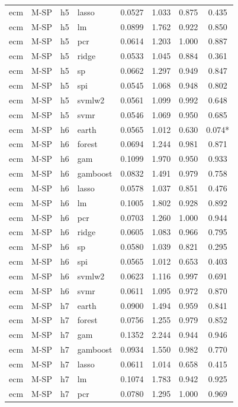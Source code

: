 \begin{ThreePartTable}
\begin{longtable}[t]{llclcccc}
ecm & M-SP & h5 & lasso & 0.0527 & 1.033 & 0.875 & 0.435\\
ecm & M-SP & h5 & lm & 0.0899 & 1.762 & 0.922 & 0.850\\
ecm & M-SP & h5 & pcr & 0.0614 & 1.203 & 1.000 & 0.887\\
ecm & M-SP & h5 & ridge & 0.0533 & 1.045 & 0.884 & 0.361\\
ecm & M-SP & h5 & sp & 0.0662 & 1.297 & 0.949 & 0.847\\
ecm & M-SP & h5 & spi & 0.0545 & 1.068 & 0.948 & 0.802\\
ecm & M-SP & h5 & svmlw2 & 0.0561 & 1.099 & 0.992 & 0.648\\
ecm & M-SP & h5 & svmr & 0.0546 & 1.069 & 0.950 & 0.685\\
\addlinespace
ecm & M-SP & h6 & earth & 0.0565 & 1.012 & 0.630 & 0.074*\\
ecm & M-SP & h6 & forest & 0.0694 & 1.244 & 0.981 & 0.871\\
ecm & M-SP & h6 & gam & 0.1099 & 1.970 & 0.950 & 0.933\\
ecm & M-SP & h6 & gamboost & 0.0832 & 1.491 & 0.979 & 0.758\\
ecm & M-SP & h6 & lasso & 0.0578 & 1.037 & 0.851 & 0.476\\
ecm & M-SP & h6 & lm & 0.1005 & 1.802 & 0.928 & 0.892\\
ecm & M-SP & h6 & pcr & 0.0703 & 1.260 & 1.000 & 0.944\\
ecm & M-SP & h6 & ridge & 0.0605 & 1.083 & 0.966 & 0.795\\
ecm & M-SP & h6 & sp & 0.0580 & 1.039 & 0.821 & 0.295\\
ecm & M-SP & h6 & spi & 0.0565 & 1.012 & 0.653 & 0.403\\
ecm & M-SP & h6 & svmlw2 & 0.0623 & 1.116 & 0.997 & 0.691\\
ecm & M-SP & h6 & svmr & 0.0611 & 1.095 & 0.972 & 0.870\\
\addlinespace
ecm & M-SP & h7 & earth & 0.0900 & 1.494 & 0.959 & 0.841\\
ecm & M-SP & h7 & forest & 0.0756 & 1.255 & 0.979 & 0.852\\
ecm & M-SP & h7 & gam & 0.1352 & 2.244 & 0.944 & 0.946\\
ecm & M-SP & h7 & gamboost & 0.0934 & 1.550 & 0.982 & 0.770\\
ecm & M-SP & h7 & lasso & 0.0611 & 1.014 & 0.658 & 0.415\\
ecm & M-SP & h7 & lm & 0.1074 & 1.783 & 0.942 & 0.925\\
ecm & M-SP & h7 & pcr & 0.0780 & 1.295 & 1.000 & 0.969\\

\end{longtable}
\end{ThreePartTable}
